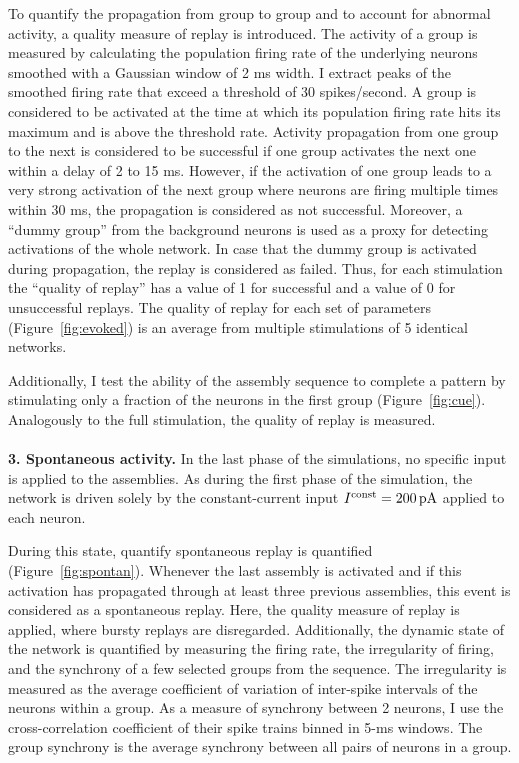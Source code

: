       To quantify the propagation from group to group and to account for abnormal activity, a quality measure of replay is introduced.
      The activity of a group is measured by calculating the population firing rate of the underlying neurons smoothed with a Gaussian window of 2 ms width.
      I extract peaks of the smoothed firing rate that exceed a threshold of 30 spikes/second.
      A group is considered to be activated at the time at which its population firing rate hits its maximum and is above the threshold rate.
      Activity propagation from one group to the next is considered to be successful if one group activates the next one within a delay of 2 to 15 ms.
      However, if the activation of one group leads to a very strong activation of the next group where neurons are firing multiple times within 30 ms, the propagation is considered as not successful.
      Moreover, a ``dummy group'' from the background neurons is used as a proxy for detecting activations of the whole network.
      In case that the dummy group is activated during propagation, the replay is considered as failed.
      Thus, for each stimulation the ``quality of replay'' has a value of 1 for successful and a value of 0 for unsuccessful replays.
      The quality of replay for each set of parameters (Figure~\ref{fig:evoked}) is an average from multiple stimulations of 5 identical networks.

      Additionally, I test the ability of the assembly sequence to complete a pattern by stimulating only a fraction of the neurons in the first group (Figure~\ref{fig:cue}).
      Analogously to the full stimulation, the quality of replay is measured.\\\\
    \textbf{3. Spontaneous activity.}
      In the last phase of the simulations, no specific input is applied to the assemblies.
      As during the first phase of the simulation, the network is driven solely by the constant-current input $I^{ \rm const}=200 \,\rm pA$ applied to each neuron.

      During this state, quantify spontaneous replay is quantified (Figure~\ref{fig:spontan}).
      Whenever the last assembly is activated and if this activation has propagated through at least three previous assemblies, this event is considered as a spontaneous replay.
      Here, the quality measure of replay is applied, where bursty replays are disregarded.
      Additionally, the dynamic state of the network is quantified by measuring the firing rate, the irregularity of firing, and the synchrony of a few selected groups from the sequence.
      The irregularity is measured as the average coefficient of variation of inter-spike intervals of the neurons within a group.
      As a measure of synchrony between 2 neurons, I use the cross-correlation coefficient of their spike trains binned in 5-ms windows.
      The group synchrony is the average synchrony between all pairs of neurons in a group.

